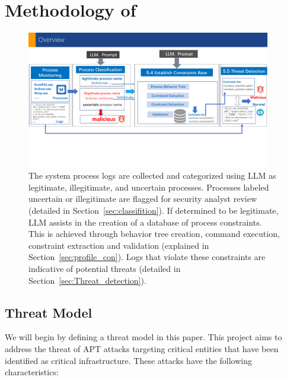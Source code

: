 \section{Methodology of \tool}

\begin{figure}[ht]
    \centering
      \includegraphics[width=0.95\textwidth]{figs/framework.pdf}
    \caption{The system process logs are collected and categorized using LLM as legitimate, illegitimate, and uncertain processes. Processes labeled uncertain or illegitimate are flagged for security analyst review (detailed in Section~\ref{sec:classifition}). If determined to be legitimate, LLM assists in the creation of a database of process constraints. This is achieved through behavior tree creation, command execution, constraint extraction and validation (explained in Section~\ref{sec:profile_con}). Logs that violate these constraints are indicative of potential threats (detailed in Section~\ref{sec:Threat_detection}).}
    \label{fig-framework}
    \end{figure}

\subsection{Threat Model}
We will begin by defining a threat model in this paper. This project aims to address the threat of APT attacks targeting critical entities that have been identified as critical infrastructure. These attacks have the following characteristics:


